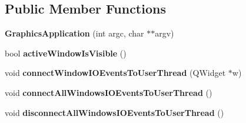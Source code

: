 \subsection*{Public Member Functions}
\begin{DoxyCompactItemize}
\item 
\hypertarget{class_d_o_1_1_graphics_application_a4eb7658f5775a01f8a1f9e03ffd75bd9}{{\bfseries Graphics\-Application} (int argc, char $\ast$$\ast$argv)}\label{class_d_o_1_1_graphics_application_a4eb7658f5775a01f8a1f9e03ffd75bd9}

\item 
\hypertarget{class_d_o_1_1_graphics_application_ad3db22dd49862e1f75afe856e6e89d1b}{bool {\bfseries active\-Window\-Is\-Visible} ()}\label{class_d_o_1_1_graphics_application_ad3db22dd49862e1f75afe856e6e89d1b}

\item 
\hypertarget{class_d_o_1_1_graphics_application_a3db095f1054de65a90af3d2631fac067}{void {\bfseries connect\-Window\-I\-O\-Events\-To\-User\-Thread} (Q\-Widget $\ast$w)}\label{class_d_o_1_1_graphics_application_a3db095f1054de65a90af3d2631fac067}

\item 
\hypertarget{class_d_o_1_1_graphics_application_ace71abe08c7012724571fed56e7e0e27}{void {\bfseries connect\-All\-Windows\-I\-O\-Events\-To\-User\-Thread} ()}\label{class_d_o_1_1_graphics_application_ace71abe08c7012724571fed56e7e0e27}

\item 
\hypertarget{class_d_o_1_1_graphics_application_aa9107742e1cddc2c5fc3854151e2e793}{void {\bfseries disconnect\-All\-Windows\-I\-O\-Events\-To\-User\-Thread} ()}\label{class_d_o_1_1_graphics_application_aa9107742e1cddc2c5fc3854151e2e793}

\end{DoxyCompactItemize}

